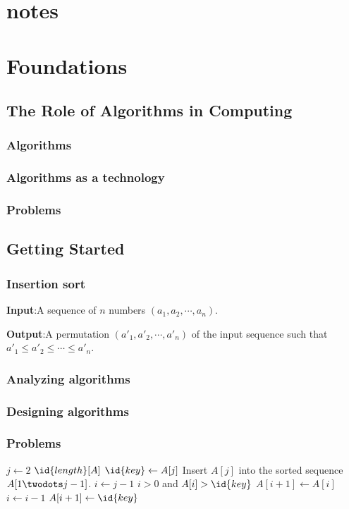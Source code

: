 \documentclass[UTF8,a4paper,12pt]{ctexart}
\begin{document}
    \pagestyle{plain}
    \section*{\huge{notes}}
    \section{Foundations}
        \subsection{The Role of Algorithms in Computing}
            \subsubsection{Algorithms}
            \subsubsection{Algorithms as a technology}
            \subsubsection{Problems}
        \subsection{Getting Started}
            \subsubsection{Insertion sort}
                \textbf{Input}:A sequence of $n$ numbers $(a_1,a_2,\cdots,a_n)$.

                \textbf{Output}:A permutation $(a'_1,a'_2,\cdots,a'_n)$ of the input sequence such that $a'_1 \leq a'_2 \leq \cdots \leq a'_n$.


            \subsubsection{Analyzing algorithms}
            \subsubsection{Designing algorithms}
            \subsubsection{Problems}      
\begin{codebox}
	\li \For $j \gets 2$ \To $\id{length}[A]$    \label{li:for}
	\li     \Do $\id{key} \gets A[j]$            \label{li:for-begin}
	\li         \Comment Insert $A[j]$ into the sorted sequence $A[1 \twodots j-1]$.
	\li         $i \gets j-1$
	\li         \While $i>0$ and $A[i]>\id{key}$ \label{li:while}
	\li            \Do $A[i+1] \gets A[i]$       \label{li:while-begin}
	\li                $i \gets i-1$             \label{li:while-end}
	\End
	\li         $A[i+1] \gets \id{key}$          \label{li:for-end}
	\End
\end{codebox}
\end{document}
